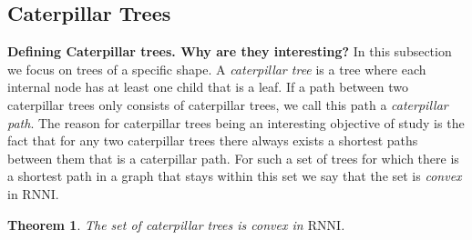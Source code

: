 \documentclass[11pt]{amsart}
\newtheorem{theorem}{Theorem}
\newcommand{\rnni}{\mathrm{RNNI}}
\newcommand{\summary}[1]{\textbf{#1}} %
\begin{document}
\subsection{Caterpillar Trees}

\summary{Defining Caterpillar trees. Why are they interesting?}
In this subsection we focus on trees of a specific shape.
A \emph{caterpillar tree} is a tree where each internal node has at least one child that is a leaf.
If a path between two caterpillar trees only consists of caterpillar trees, we call this path a \emph{caterpillar path}.
The reason for caterpillar trees being an interesting objective of study is the fact that for any two caterpillar trees there always exists a shortest paths between them that is a caterpillar path.
For such a set of trees for which there is a shortest path in a graph that stays within this set we say that the set is \emph{convex} in $\rnni$.

\begin{theorem}
	The set of caterpillar trees is convex in $\rnni$.
	\label{thm:caterpillar_convex_rnni}
\end{theorem}
\end{document}
